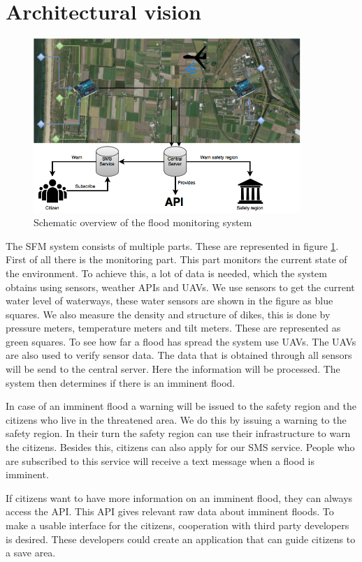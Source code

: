 \section{Architectural vision}
\label{sec:archvision}
\begin{figure}[H]
	\includegraphics[keepaspectratio=true,width=0.9\textwidth]{images/archVision.png}
	\caption{Schematic overview of the flood monitoring system}
	\label{fig:architectural-vision}
\end{figure}

The \gls{SFM} system consists of multiple parts. These are represented in figure \ref{fig:architectural-vision}. First of all there is the monitoring part. This part monitors the current state of the environment. To achieve this, a lot of data is needed, which the system obtains using sensors, weather \gls{API}s and \gls{UAV}s. We use sensors to get the current water level of waterways, these water sensors are shown in the figure as blue squares. We also measure the density and structure of dikes, this is done by pressure meters, temperature meters and tilt meters. These are represented as green squares. To see how far a flood has spread the system use UAVs. The UAVs are also used to verify sensor data. The data that is obtained through all sensors will be send to the central server. Here the information will be processed. The system then determines if there is an imminent flood.

In case of an imminent flood a warning will be issued to the safety region and the citizens who live in the threatened area. We do this by issuing a warning to the safety region. In their turn the safety region can use their infrastructure to warn the citizens. Besides this, citizens can also apply for our SMS service. People who are subscribed to this service will receive a text message when a flood is imminent.

If citizens want to have more information on an imminent flood, they can always access the API. This API gives relevant raw data about imminent floods. To make a usable interface for the citizens, cooperation with third party developers is desired. These developers could create an application that can guide citizens to a save area.
